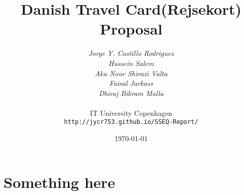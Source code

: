 \documentclass[11pt,a4paper,oneside]{report}
\begin{document}
\title{Danish Travel Card(Rejsekort) Proposal}
\author{\textit{Jorge Y. Castillo Rodriguez}\\
  \textit{Hussein Salem}\\
  \textit{Aku Nour Shirazi Valta}\\
  \textit{Faisal Jarkass}\\
  \textit{Dhiraj Bikram Malla}\\
  \\
  IT University Copenhagen\\
  \texttt{http://jycr753.github.io/SSEQ-Report/}}
\date{\today}
\maketitle
\section{Something here}
\end{document}
